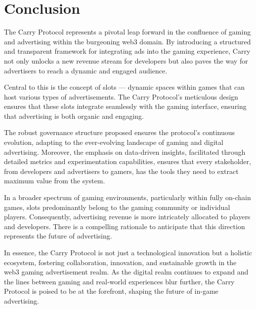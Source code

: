 \section{Conclusion}

The Carry Protocol represents a pivotal leap forward in the confluence of gaming and advertising within the burgeoning web3 domain. By introducing a structured and transparent framework for integrating ads into the gaming experience, Carry not only unlocks a new revenue stream for developers but also paves the way for advertisers to reach a dynamic and engaged audience.

Central to this is the concept of slots — dynamic spaces within games that can host various types of advertisements. The Carry Protocol's meticulous design ensures that these slots integrate seamlessly with the gaming interface, ensuring that advertising is both organic and engaging.

The robust governance structure proposed ensures the protocol's continuous evolution, adapting to the ever-evolving landscape of gaming and digital advertising. Moreover, the emphasis on data-driven insights, facilitated through detailed metrics and experimentation capabilities, ensures that every stakeholder, from developers and advertisers to gamers, has the tools they need to extract maximum value from the system.

In a broader spectrum of gaming environments, particularly within fully on-chain games, slots predominantly belong to the gaming community or individual players. Consequently, advertising revenue is more intricately allocated to players and developers. There is a compelling rationale to anticipate that this direction represents the future of advertising.

In essence, the Carry Protocol is not just a technological innovation but a holistic ecosystem, fostering collaboration, innovation, and sustainable growth in the web3 gaming advertisement realm. As the digital realm continues to expand and the lines between gaming and real-world experiences blur further, the Carry Protocol is poised to be at the forefront, shaping the future of in-game advertising.
